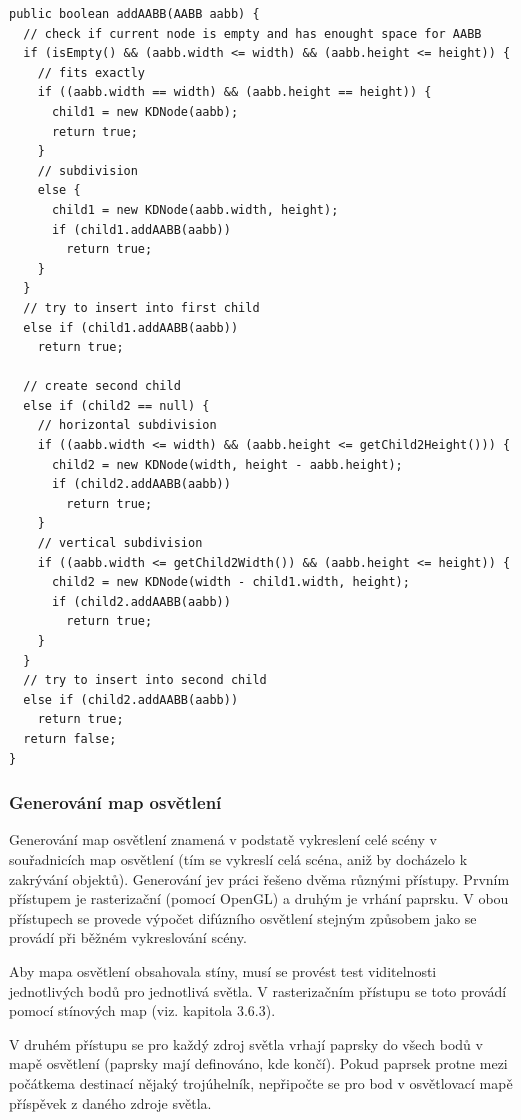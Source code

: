 \documentclass[11pt,twoside,a4paper]{book}
\begin{document}
\lstset{language=Java} 
\begin{lstlisting}[caption=Vkládání AABB do kD stromu za využití rekurze]
public boolean addAABB(AABB aabb) {
  // check if current node is empty and has enought space for AABB
  if (isEmpty() && (aabb.width <= width) && (aabb.height <= height)) {
    // fits exactly
    if ((aabb.width == width) && (aabb.height == height)) {
      child1 = new KDNode(aabb);
      return true;
    }         
    // subdivision
    else {
      child1 = new KDNode(aabb.width, height);
      if (child1.addAABB(aabb))
        return true;
    }
  }     
  // try to insert into first child
  else if (child1.addAABB(aabb))
    return true;

  // create second child
  else if (child2 == null) {    
    // horizontal subdivision
    if ((aabb.width <= width) && (aabb.height <= getChild2Height())) {
      child2 = new KDNode(width, height - aabb.height);
      if (child2.addAABB(aabb))
        return true;
    }      
    // vertical subdivision
    if ((aabb.width <= getChild2Width()) && (aabb.height <= height)) {
      child2 = new KDNode(width - child1.width, height);
      if (child2.addAABB(aabb))
        return true;
    }
  }     
  // try to insert into second child
  else if (child2.addAABB(aabb))
    return true;
  return false;
}
\end{lstlisting}

\subsubsection{Generování map osvětlení}
Generování map osvětlení znamená v podstatě vykreslení celé scény v souřadnicích map osvětlení (tím se vykreslí celá scéna, aniž by docházelo k zakrývání objektů). Generování je\linebreak v práci řešeno dvěma různými přístupy. Prvním přístupem je rasterizační (pomocí OpenGL) a druhým je vrhání paprsku. V obou přístupech se provede výpočet difúzního osvětlení stejným způsobem jako se provádí při běžném vykreslování scény. 

Aby mapa osvětlení obsahovala stíny, musí se provést test viditelnosti jednotlivých bodů pro jednotlivá světla. V rasterizačním přístupu se toto provádí pomocí stínových map (viz. kapitola 3.6.3).

V druhém přístupu se pro každý zdroj světla vrhají paprsky do všech bodů v mapě osvětlení (paprsky mají definováno, kde končí). Pokud paprsek protne mezi počátkem\linebreak a destinací nějaký trojúhelník, nepřipočte se pro bod v osvětlovací mapě příspěvek z daného zdroje světla.
\end{document}
